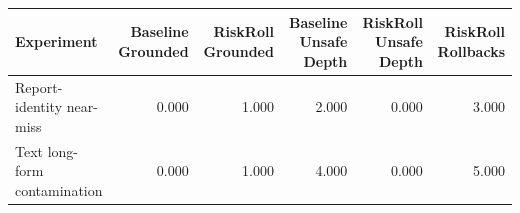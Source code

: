 \begin{tabular}{lrrrrr}
\toprule
Experiment & Baseline Grounded & RiskRoll Grounded & Baseline Unsafe Depth & RiskRoll Unsafe Depth & RiskRoll Rollbacks \\
\midrule
Report-identity near-miss & 0.000 & 1.000 & 2.000 & 0.000 & 3.000 \\
Text long-form contamination & 0.000 & 1.000 & 4.000 & 0.000 & 5.000 \\
\bottomrule
\end{tabular}
